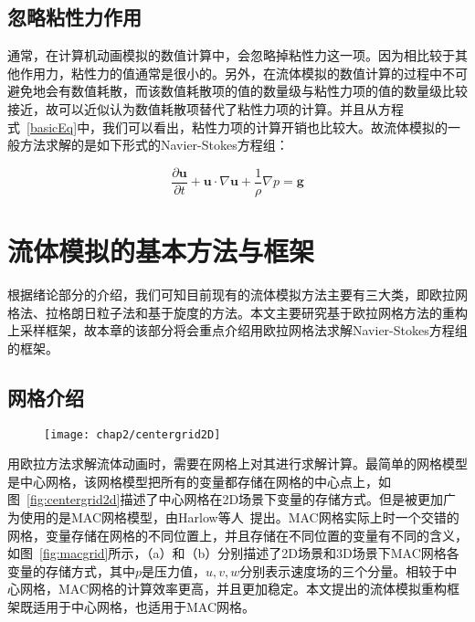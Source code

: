 \subsection{忽略粘性力作用}

通常，在计算机动画模拟的数值计算中，会忽略掉粘性力这一项。因为相比较于其他作用力，粘性力的值通常是很小的。另外，在流体模拟的数值计算的过程中不可避免地会有数值耗散，而该数值耗散项的值的数量级与粘性力项的值的数量级比较接近，故可以近似认为数值耗散项替代了粘性力项的计算。并且从方程式~\ref{basicEq}中，我们可以看出，粘性力项的计算开销也比较大。故流体模拟的一般方法求解的是如下形式的Navier-Stokes方程组：

\begin{equation}
\label{basicEqignoreVis}
 \frac{\partial \boldsymbol u}{\partial t} + {\boldsymbol u} \cdot \nabla {\boldsymbol u} + \frac{1}{\rho} \nabla p= {\boldsymbol g}
\end{equation}

\section{流体模拟的基本方法与框架}

根据绪论部分的介绍，我们可知目前现有的流体模拟方法主要有三大类，即欧拉网格法、拉格朗日粒子法和基于旋度的方法。本文主要研究基于欧拉网格方法的重构上采样框架，故本章的该部分将会重点介绍用欧拉网格法求解Navier-Stokes方程组的框架。

\subsection{网格介绍}

\begin{figure}
  \centering
   \texttt{[image: chap2/centergrid2D]}
\end{figure}

用欧拉方法求解流体动画时，需要在网格上对其进行求解计算。最简单的网格模型是中心网格，该网格模型把所有的变量都存储在网格的中心点上，如图~\ref{fig:centergrid2d}描述了中心网格在2D场景下变量的存储方式。但是被更加广为使用的是MAC网格模型，由Harlow等人~\cite{harlow1965numerical}提出。MAC网格实际上时一个交错的网格，变量存储在网格的不同位置上，并且存储在不同位置的变量有不同的含义，如图~\ref{fig:macgrid}所示，（a）和（b）分别描述了2D场景和3D场景下MAC网格各变量的存储方式，其中\(p\)是压力值，\(u,v,w\)分别表示速度场的三个分量。相较于中心网格，MAC网格的计算效率更高，并且更加稳定。本文提出的流体模拟重构框架既适用于中心网格，也适用于MAC网格。

